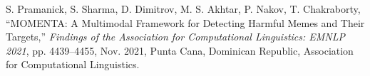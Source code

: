 \documentclass[conference]{IEEEtran}
\begin{document}
\begin{thebibliography}{00}
S. Pramanick, S. Sharma, D. Dimitrov, M. S. Akhtar, P. Nakov, T. Chakraborty, ``{MOMENTA}: A Multimodal Framework for Detecting Harmful Memes and Their Targets,'' \emph{Findings of the Association for Computational Linguistics: EMNLP 2021}, pp. 4439--4455, Nov. 2021, Punta Cana, Dominican Republic, Association for Computational Linguistics.



\end{thebibliography}

\vspace{12pt}
\end{document}
